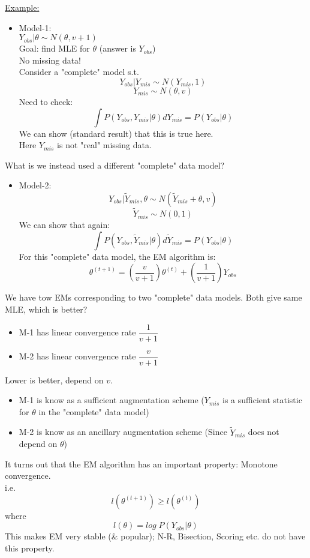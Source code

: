 \documentclass[12pt]{article}
\begin{document}
\underline {Example:}\\
\begin{itemize}
\item Model-1: \\
$Y_{obs}|\theta \sim N(\theta, v+1)$\\
Goal: find MLE for $\theta$ (answer is $Y_{obs}$)\\
No missing data!\\
Consider a "complete" model s.t.
$$Y_{obs}|Y_{mis}\sim N(Y_{mis}, 1)$$
$$ Y_{mis} \sim N(\theta, v)$$
Need to check:
$$\int P(Y_{obs}, Y_{mis}|\theta)dY_{mis}=P(Y_{obs}|\theta)$$
We can show (standard result) that this is true here.\\
Here $Y_{mis}$ is not "real" missing data.\\
\end{itemize}
What is we instead used a different "complete" data model?
\begin{itemize}
\item Model-2:\\
$$Y_{obs}| \widetilde{Y}_{mis}, \theta \sim N( \widetilde{Y}_{mis}+ \theta, v)$$
$$\widetilde{Y}_{mis}\sim N(0, 1)$$
We can show that again:
$$\int P(Y_{obs}, \widetilde{Y}_{mis}|\theta)d\widetilde{Y}_{mis}=P(Y_{obs}|\theta)$$
For this "complete" data model, the EM algorithm is:
$$\theta^{(t+1)}=(\dfrac{v}{v+1})\theta^{(t)}+(\dfrac{1}{v+1})Y_{obs}$$
\end{itemize}
We have tow EMs corresponding to two "complete" data models. Both give same MLE, which is better?
\begin{itemize}
\item M-1 has linear convergence rate $\dfrac{1}{v+1}$ 
\item M-2 has linear convergence rate $\dfrac{v}{v+1}$ 
\end{itemize}
Lower is better, depend on $v$. 
\begin{itemize}
\item M-1 is know as a sufficient augmentation scheme ($Y_{mis}$ is a sufficient statistic for $\theta$ in the "complete" data model)
\item M-2 is know as an ancillary augmentation scheme (Since $\widetilde{Y}_{mis}$ does not depend on $\theta$)
\end{itemize}
It turns out that the EM algorithm has an important property: Monotone convergence.\\
i.e. $$l(\theta^{(t+1)})\geqslant l(\theta^{(t)})$$
where $$l(\theta)=log\;P(Y_{obs}|\theta)$$
This makes EM very stable (\& popular); N-R, Bisection, Scoring etc. do not have this property. \\
\end{document}
